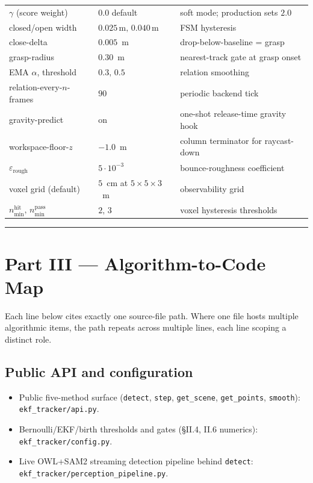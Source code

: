 \documentclass[11pt]{article}
\newcommand{\file}[1]{\texttt{#1}}
\begin{document}
\begin{tabular}{@{}lll@{}}
$\gamma$ (score weight) & $0.0$ default & soft mode; production sets $2.0$ \\
closed/open width & $0.025\,\mathrm{m},\,0.040\,\mathrm{m}$ & FSM hysteresis \\
close-delta & $0.005$~m & drop-below-baseline = grasp \\
grasp-radius & $0.30$~m & nearest-track gate at grasp onset \\
EMA $\alpha$, threshold & $0.3,\,0.5$ & relation smoothing \\
relation-every-$n$-frames & $90$ & periodic backend tick \\
gravity-predict & on & one-shot release-time gravity hook \\
workspace-floor-$z$ & $-1.0$~m & column terminator for raycast-down \\
$\varepsilon_{\text{rough}}$ & $5\!\cdot\!10^{-3}$ & bounce-roughness coefficient \\
voxel grid (default) & $5$~cm at $5{\times}5{\times}3$~m & observability grid \\
$n_{\min}^{\text{hit}},\,n_{\min}^{\text{pass}}$ & $2,\,3$ & voxel hysteresis thresholds \\
\end{tabular}

\bigskip\hrule\bigskip

\section*{Part III --- Algorithm-to-Code Map}
\label{sec:map}

\sloppy

Each line below cites exactly one source-file path. Where one file hosts
multiple algorithmic items, the path repeats across multiple lines, each
line scoping a distinct role.

\subsection*{Public API and configuration}
\begin{itemize}[leftmargin=1.5em,itemsep=0pt,topsep=2pt]
\item Public five-method surface (\texttt{detect}, \texttt{step}, \texttt{get\_scene}, \texttt{get\_points}, \texttt{smooth}): \file{ekf\_tracker/api.py}.
\item Bernoulli/EKF/birth thresholds and gates (\S II.4, II.6 numerics): \file{ekf\_tracker/config.py}.
\item Live OWL+SAM2 streaming detection pipeline behind \texttt{detect}: \file{ekf\_tracker/perception\_pipeline.py}.
\end{itemize}
\end{document}
